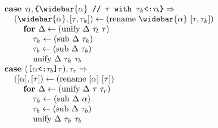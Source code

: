 \documentclass[acmsmall]{acmart}
\begin{document}
\begin{figure*}[h]
\[\begin{array}[t]{@{} l}
    \\

    \I \B{case } \tau_l, \code{\{$\widebar{\alpha}$ // $\tau$ with $\tau_k$<:$\tau_b$\}} \Rightarrow 
    \\
    \I\I (\widebar{\alpha}, [\tau, \tau_k]) \leftarrow (\F{rename } \widebar{\alpha}\ [\tau, \tau_k])
    \\
    \I\I\I \B{for } \Delta \leftarrow (\F{unify } \Delta\ \tau_l\ \tau) 
    \\
    \I\I\I\I \tau_k \leftarrow (\F{sub } \Delta\ \tau_k)
    \\
    \I\I\I\I \tau_b \leftarrow (\F{sub } \Delta\ \tau_b)
    \\
    \I\I\I\I \F{unify } \Delta\ \tau_k\ \tau_b

    \\

    \I \B{case } (\code{[$\alpha$<:$\tau_b$]$\tau$}), \tau_r \Rightarrow 
    \\
    \I\I ([\alpha], [\tau]) \leftarrow (\F{rename } [\alpha]\ [\tau])
    \\
    \I\I\I \B{for } \Delta \leftarrow (\F{unify } \Delta\ \tau\ \tau_r)
    \\
    \I\I\I\I \tau_k \leftarrow (\F{sub } \Delta\ \alpha)
    \\
    \I\I\I\I \tau_b \leftarrow (\F{sub } \Delta\ \tau_b)
    \\
    \I\I\I\I \F{unify } \Delta\ \tau_k\ \tau_b




\end{array}\]
\end{figure*}
\end{document}
